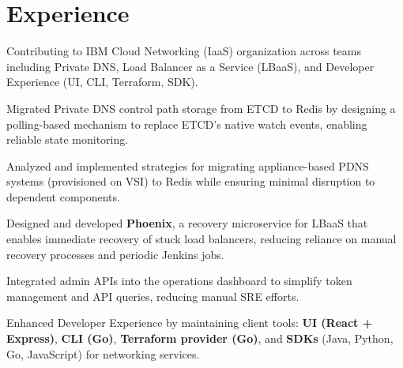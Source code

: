 \documentclass[]{deedy-resume-reversed}
\begin{document}
%
%

%
%

%
%

\begin{minipage}[t]{0.60\textwidth}



\section{Experience}
\vspace{\topsep}
\begin{tightemize}
\item Contributing to IBM Cloud Networking (IaaS) organization across teams including Private DNS, Load Balancer as a Service (LBaaS), and Developer Experience (UI, CLI, Terraform, SDK).
\item Migrated Private DNS control path storage from ETCD to Redis by designing a polling-based mechanism to replace ETCD’s native watch events, enabling reliable state monitoring.
\item Analyzed and implemented strategies for migrating appliance-based PDNS systems (provisioned on VSI) to Redis while ensuring minimal disruption to dependent components.
\item Designed and developed \textbf{Phoenix}, a recovery microservice for LBaaS that enables immediate recovery of stuck load balancers, reducing reliance on manual recovery processes and periodic Jenkins jobs.
\item Integrated admin APIs into the operations dashboard to simplify token management and API queries, reducing manual SRE efforts.
\item Enhanced Developer Experience by maintaining client tools: \textbf{UI (React + Express)}, \textbf{CLI (Go)}, \textbf{Terraform provider (Go)}, and \textbf{SDKs} (Java, Python, Go, JavaScript) for networking services.
\end{tightemize}
\sectionsep


\end{minipage}
\end{document}
